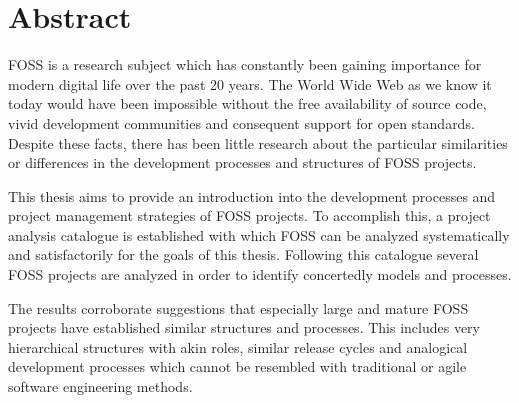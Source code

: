 
{}

\chapter*{Abstract}

\acl{FOSS} is a research subject which has constantly been gaining importance
for modern digital life over the past 20 years. The World Wide Web as we know
it today would have been impossible without the free availability of source
code, vivid development communities and consequent support for open standards.
Despite these facts, there has been little research about the particular
similarities or differences in the development processes and structures of
\acl{FOSS} projects.

This thesis aims to provide an introduction into the development processes and
project management strategies of \acl{FOSS} projects. To accomplish this, a
project analysis catalogue is established with which \acl{FOSS} can be analyzed
systematically and satisfactorily for the goals of this thesis. Following this
catalogue several \acl{FOSS} projects are analyzed in order to identify
concertedly models and processes.

The results corroborate suggestions that especially large and mature \acl{FOSS}
projects have established similar structures and processes. This includes very
hierarchical structures with akin roles, similar release cycles and analogical
development processes which cannot be resembled with traditional or agile
software engineering methods.
